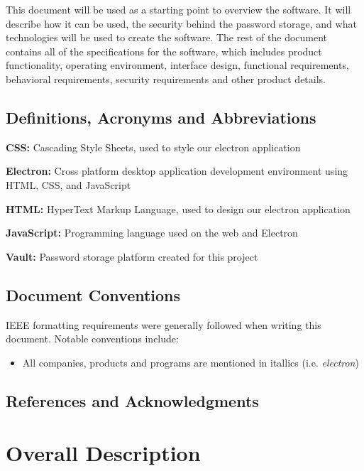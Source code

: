 \documentclass[11pt]{report}
\begin{document}
This document will be used as a starting point to overview the
software. It will describe how it can be used, the security behind the
password storage, and what technologies will be used to create the software.
The rest of the document contains all of the specifications for the
software, which includes product functionality, operating environment,
interface design, functional requirements, behavioral requirements, 
security requirements and other product details.


\section{Definitions, Acronyms and Abbreviations}
\textbf{CSS:} Cascading Style Sheets, used to style our electron application

\textbf{Electron:} Cross platform desktop application development environment
using HTML, CSS, and JavaScript

\textbf{HTML:} HyperText Markup Language, used to design our electron application

\textbf{JavaScript:} Programming language used on the web and Electron

\textbf{Vault:} Password storage platform created for this project


\section{Document Conventions}
IEEE formatting requirements were generally followed when writing this document.
Notable conventions include:

\begin{itemize}
    \item All companies, products and programs are mentioned in itallics (i.e. \textit{electron})
    
\end{itemize}


\section{References and Acknowledgments}

    \nocite{*}
    \printbibliography[heading=none]



\chapter{Overall Description}
\end{document}
